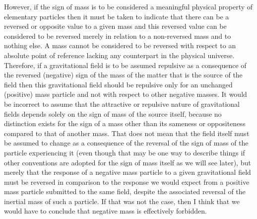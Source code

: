 \documentclass[notitlepage,12pt]{report}
\begin{document}
However, if the sign of mass is to be considered a meaningful physical property of elementary particles then it must be taken to indicate that there can be a reversed or opposite value to a given mass and this reversed value can be considered to be reversed merely in relation to a non-reversed mass and to nothing else. A mass cannot be considered to be reversed with respect to an absolute point of reference lacking any counterpart in the physical universe. Therefore, if a gravitational field is to be assumed repulsive as a consequence of the reversed (negative) sign of the mass of the matter that is the source of the field then this gravitational field should be repulsive only for an unchanged (positive) mass particle and not with respect to other negative masses. It would be incorrect to assume that the attractive or repulsive nature of gravitational fields depends solely on the sign of mass of the source itself, because no distinction exists for the sign of a mass other than its sameness or oppositeness compared to that of another mass. That does not mean that the field itself must be assumed to change as a consequence of the reversal of the sign of mass of the particle experiencing it (even though that may be one way to describe things if other conventions are adopted for the sign of mass itself as we will see later), but merely that the response of a negative mass particle to a given gravitational field must be reversed in comparison to the response we would expect from a positive mass particle submitted to the same field, despite the associated reversal of the inertial mass of such a particle. If that was not the case, then I think that we would have to conclude that negative mass is effectively forbidden.
\end{document}
